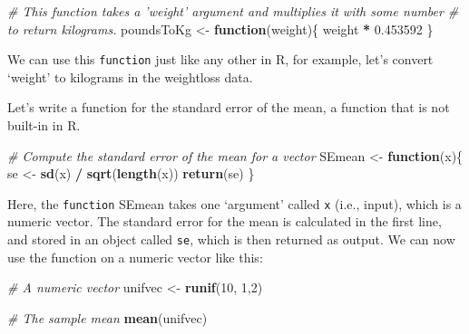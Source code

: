 \documentclass[]{book}
\newenvironment{Shaded}{\begin{snugshade}}{\end{snugshade}}
\newcommand{\CommentTok}[1]{\textcolor[rgb]{0.56,0.35,0.01}{\textit{#1}}}
\newcommand{\ControlFlowTok}[1]{\textcolor[rgb]{0.13,0.29,0.53}{\textbf{#1}}}
\newcommand{\DecValTok}[1]{\textcolor[rgb]{0.00,0.00,0.81}{#1}}
\newcommand{\FloatTok}[1]{\textcolor[rgb]{0.00,0.00,0.81}{#1}}
\newcommand{\KeywordTok}[1]{\textcolor[rgb]{0.13,0.29,0.53}{\textbf{#1}}}
\newcommand{\NormalTok}[1]{#1}
\newcommand{\OperatorTok}[1]{\textcolor[rgb]{0.81,0.36,0.00}{\textbf{#1}}}
\newcommand{\StringTok}[1]{\textcolor[rgb]{0.31,0.60,0.02}{#1}}
\begin{document}
\begin{Shaded}
\begin{Highlighting}[]
\CommentTok{# This function takes a 'weight' argument and multiplies it with some number }
\CommentTok{# to return kilograms.}
\NormalTok{poundsToKg <-}\StringTok{ }\ControlFlowTok{function}\NormalTok{(weight)\{}
\NormalTok{  weight }\OperatorTok{*}\StringTok{ }\FloatTok{0.453592}
\NormalTok{\}}
\end{Highlighting}
\end{Shaded}

We can use this \texttt{function} just like any other in R, for example, let's convert `weight' to kilograms in the weightloss data.

\begin{Shaded}
\end{Shaded}

Let's write a function for the standard error of the mean, a function that is not built-in in R.

\begin{Shaded}
\begin{Highlighting}[]
\CommentTok{# Compute the standard error of the mean for a vector}
\NormalTok{SEmean <-}\StringTok{ }\ControlFlowTok{function}\NormalTok{(x)\{}
\NormalTok{  se <-}\StringTok{ }\KeywordTok{sd}\NormalTok{(x) }\OperatorTok{/}\StringTok{ }\KeywordTok{sqrt}\NormalTok{(}\KeywordTok{length}\NormalTok{(x))}
  \KeywordTok{return}\NormalTok{(se)}
\NormalTok{\}}
\end{Highlighting}
\end{Shaded}

Here, the \texttt{function} SEmean takes one `argument' called \texttt{x} (i.e., input), which is a numeric vector. The standard error for the mean is calculated in the first line, and stored in an object called \texttt{se}, which is then returned as output. We can now use the function on a numeric vector like this:

\begin{Shaded}
\begin{Highlighting}[]
\CommentTok{# A numeric vector}
\NormalTok{unifvec <-}\StringTok{ }\KeywordTok{runif}\NormalTok{(}\DecValTok{10}\NormalTok{, }\DecValTok{1}\NormalTok{,}\DecValTok{2}\NormalTok{)}

\CommentTok{# The sample mean}
\KeywordTok{mean}\NormalTok{(unifvec)}
\end{Highlighting}
\end{Shaded}
\end{document}

